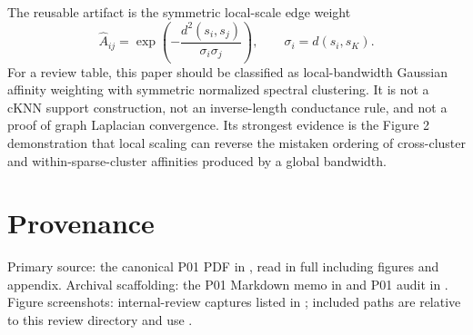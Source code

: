 \documentclass[11pt]{article}
\begin{document}
The reusable artifact is the symmetric local-scale edge weight
\[
  \hat A_{ij}
  =
  \exp\left(-\frac{d^2(s_i,s_j)}{\sigma_i\sigma_j}\right),
  \qquad
  \sigma_i=d(s_i,s_K).
\]
For a review table, this paper should be classified as local-bandwidth
Gaussian affinity weighting with symmetric normalized spectral clustering. It
is not a cKNN support construction, not an inverse-length conductance rule,
and not a proof of graph Laplacian convergence. Its strongest evidence is the
Figure 2 demonstration that local scaling can reverse the mistaken ordering of
cross-cluster and within-sparse-cluster affinities produced by a global
bandwidth.

\section*{Provenance}

Primary source: the canonical P01 PDF in , read in full
including figures and appendix. Archival scaffolding: the P01 Markdown memo in
\texttt{} and P01 audit in . Figure screenshots:
internal-review captures listed in
\texttt{}; included paths are relative
to this review directory and use \texttt{}.



\end{document}
